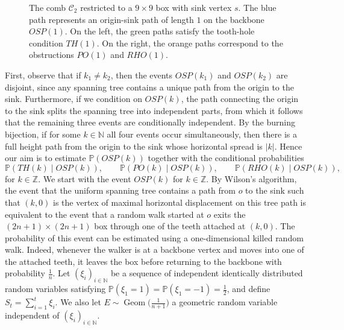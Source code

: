 \documentclass[11pt]{article}
\newcommand{\Z}{\mathbb{Z}}
\newcommand{\Prob}{\mathbb{P}}
\begin{document}
\begin{figure}
\begin{minipage}{0.45\textwidth}
\end{minipage}
\caption{The comb $\mathcal{C}_2$ restricted to a $9\times9$ box with sink vertex $s$. The blue path represents an origin-sink path of length $1$ on the backbone $OSP(1)$. On the left, the green paths satisfy the tooth-hole condition $TH(1)$. On the right, the orange paths correspond to the obstructions $PO(1)$ and $RHO(1)$.}
\label{fig:comb-lattice_events}
\end{figure}

First, observe that if $k_1\neq k_2$, then the events $OSP(k_1)$ and $OSP(k_2)$ are disjoint, since any spanning tree contains a unique path from the origin to the sink. Furthermore, if we condition on $OSP(k)$, the path connecting the origin to the sink splits the spanning tree into independent parts, from which it follows that the remaining three events are conditionally independent. 
By the burning bijection, if for some $k\in\mathbb{N}$ all four events occur simultaneously, then there is a full height path from the origin to the sink whose horizontal spread is \(|k|\). Hence our aim is to estimate
$\Prob(OSP(k))$
together with the conditional probabilities
\[
\Prob(TH(k)\mid OSP(k)),\qquad
\Prob(PO(k)\mid OSP(k)),\qquad
\Prob(RHO(k)\mid OSP(k)),
\]
for \(k\in\mathbb{Z}\).
We start with the event $OSP(k)$ for $k\in\Z$.
By Wilson’s algorithm, the event that the uniform spanning tree contains a path from $o$ to the sink such that $(k,0)$ is the vertex of maximal horizontal displacement on this tree path is equivalent to the event that a random walk started at $o$ exits the $(2n+1)\times(2n+1)$ box through one of the teeth attached at $(k,0)$. The probability of this event can be estimated using a one-dimensional killed random walk. Indeed, whenever the walker is at a backbone vertex and moves into one of the attached teeth, it leaves the box before returning to the backbone with probability $\frac{1}{n}$. Let $(\xi_i)_{i\in\mathbb{N}}$ be a sequence of independent identically distributed random variables satisfying $\mathbb{P}(\xi_1=1)=\mathbb{P}(\xi_1=-1)=\frac{1}{2}$,
and define $S_t=\sum_{i=1}^t \xi_i$. We also let $E\sim \operatorname{Geom}\big(\frac{1}{n+1}\big)$ a geometric random variable independent of $(\xi_i)_{i\in\mathbb{N}}$.
\end{document}
